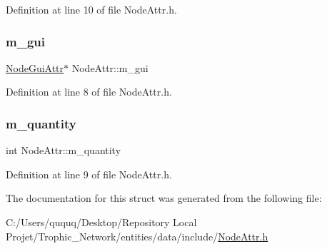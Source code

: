 Definition at line 10 of file Node\+Attr.\+h.

\mbox{\label{struct_node_attr_ab879f09d2cedd542d240f529062c495f}} 
\subsubsection{\texorpdfstring{m\+\_\+gui}{m\_gui}}
{\footnotesize\ttfamily \mbox{\hyperlink{struct_node_gui_attr}{Node\+Gui\+Attr}}$\ast$ Node\+Attr\+::m\+\_\+gui}



Definition at line 8 of file Node\+Attr.\+h.

\mbox{\label{struct_node_attr_a4f41a824fc2c1c549673ee35999b1133}} 
\subsubsection{\texorpdfstring{m\+\_\+quantity}{m\_quantity}}
{\footnotesize\ttfamily int Node\+Attr\+::m\+\_\+quantity}



Definition at line 9 of file Node\+Attr.\+h.



The documentation for this struct was generated from the following file\+:\begin{DoxyCompactItemize}
\item 
C\+:/\+Users/ququq/\+Desktop/\+Repository Local Projet/\+Trophic\+\_\+\+Network/entities/data/include/\mbox{\hyperlink{_node_attr_8h}{Node\+Attr.\+h}}\end{DoxyCompactItemize}
